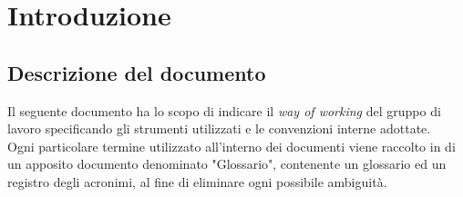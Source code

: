 \section{Introduzione}
\subsection{Descrizione del documento}
Il  seguente documento ha lo scopo di indicare il \textit{way of working} del gruppo di lavoro specificando gli strumenti utilizzati e le convenzioni interne adottate.\\
\noindent
Ogni particolare termine utilizzato all'interno dei documenti viene raccolto in di un apposito documento denominato "Glossario", contenente un glossario ed un registro degli acronimi, al fine di eliminare ogni possibile ambiguità.